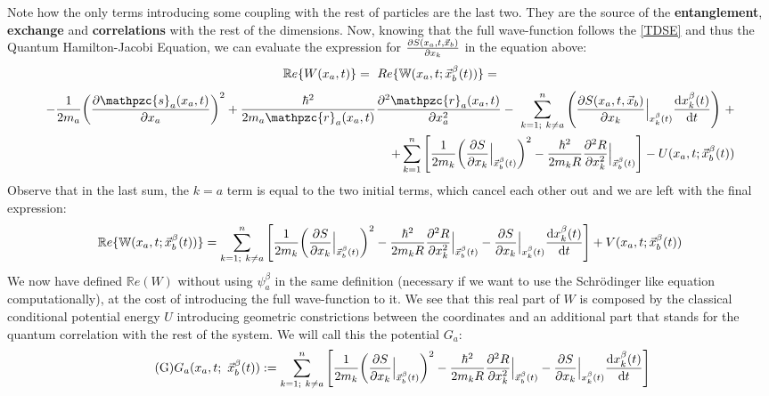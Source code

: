 \documentclass[11pt, a4paper]{article} %
\newcommand{\R}{\mathbb{R}} %
\newcommand{\z}{\mathpzc{s}}
\newcommand{\p}{\mathpzc{r}}
\newcommand{\W}{\mathbb{W}}
\begin{document}
Note how the only terms introducing some coupling with the rest of particles are the last two. They are the source of the {\bf entanglement}, {\bf exchange} and {\bf correlations} with the rest of the dimensions. Now, knowing that the full wave-function follows the \ref{TDSE} and thus the Quantum Hamilton-Jacobi Equation, we can evaluate the expression for $\pdv{S(x_a,t,\vec{x}_b)}{x_k}$ in the equation above:\vspace{-0.3cm}
$$
\R e\{W(x_a,t)\}=\ Re\{\W(x_a,t; \vec{x}_b^\beta(t))\}=\vspace{-0.14cm}
$$
\begin{equation*}
\begin{split}
-\frac{1}{2m_a} \qty(\pdv{\z_a(x_a,t)}{x_a})^2 +\frac{\hbar^2}{2m_a\p_a(x_a,t)}\pdv[2]{\p_a(x_a, t)}{x_a}- \ \sum_{k=1;\ k\neq a}^n \qty( \pdv{S(x_a,t,\vec{x}_b)}{x_k}\Big\rvert_{x_k^\beta(t)} \dv{x_k^\beta(t)}{t})\ + \\ \ +\sum_{k=1}^n \qty[\frac{1}{2m_k} \qty(\pdv{S}{x_k}\Big\rvert_{\vec{x}_b^\beta(t)})^2 -\frac{\hbar^2}{2m_kR}\pdv[2]{R}{x_k}\Big\rvert_{\vec{x}_b^\beta(t)} ] - U(x_a,t; \vec{x}_b^\beta(t))
\end{split}
\end{equation*}
Observe that in the last sum, the $k=a$ term is equal to the two initial terms, which cancel each other out and we are left with the final expression:\vspace{-0.3cm}\label{ReW}
\begin{equation*}
\R e\{\W(x_a,t; \vec{x}_b^\beta(t))\}=\sum_{k=1;\ k \neq a}^n \qty[\frac{1}{2m_k} \qty(\pdv{S}{x_k}\Big\rvert_{\vec{x}_b^\beta(t)})^2 -\frac{\hbar^2}{2m_kR}\pdv[2]{R}{x_k}\Big\rvert_{\vec{x}_b^\beta(t)} -\pdv{S}{x_k}\Big\rvert_{x_k^\beta(t)} \dv{x_k^\beta(t)}{t} ] + V(x_a,t; \vec{x}_b^\beta(t))
\end{equation*}
We now have defined $\R e(W)$ without using $\psi_a^\beta$ in the same definition (necessary if we want to use the Schrödinger like equation computationally), at the cost of introducing the full wave-function to it. We see that this real part of $W$ is composed by the classical conditional potential energy $U$ introducing geometric constrictions between the coordinates and an additional part that stands for the quantum correlation with the rest of the system. We will call this the potential $G_a$:
\begin{equation}\label{G}\tag{G}
G_a(x_a,t;\ \vec{x}_b^\beta(t)):=  \sum_{k=1;\ k \neq a}^n \qty[\frac{1}{2m_k} \qty(\pdv{S}{x_k}\Big\rvert_{\vec{x}_b^\beta(t)})^2 -\frac{\hbar^2}{2m_kR}\pdv[2]{R}{x_k}\Big\rvert_{\vec{x}_b^\beta(t)} -\pdv{S}{x_k}\Big\rvert_{x_k^\beta(t)} \dv{x_k^\beta(t)}{t} ]
\end{equation}
\end{document}
